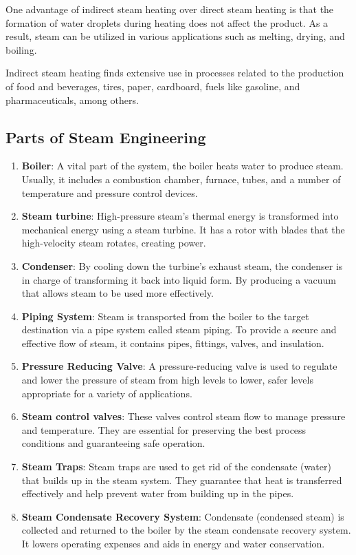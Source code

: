 One advantage of indirect steam heating over direct steam heating is that the formation of water droplets during heating does not affect the product. As a result, steam can be utilized in various applications such as melting, drying, and boiling.

Indirect steam heating finds extensive use in processes related to the production of food and beverages, tires, paper, cardboard, fuels like gasoline, and pharmaceuticals, among others.

\subsection{Parts of Steam Engineering}
\begin{enumerate}
    \item \textbf{Boiler}: A vital part of the system, the boiler heats water to produce steam. Usually, it includes a combustion chamber, furnace, tubes, and a number of temperature and pressure control devices. 
    \item \textbf{Steam turbine}: High-pressure steam's thermal energy is transformed into mechanical energy using a steam turbine. It has a rotor with blades that the high-velocity steam rotates, creating power. 
    \item \textbf{Condenser}: By cooling down the turbine's exhaust steam, the condenser is in charge of transforming it back into liquid form. By producing a vacuum that allows steam to be used more effectively. 
    \item \textbf{Piping System}: Steam is transported from the boiler to the target destination via a pipe system called steam piping. To provide a secure and effective flow of steam, it contains pipes, fittings, valves, and insulation. 
    \item \textbf{Pressure Reducing Valve}: A pressure-reducing valve is used to regulate and lower the pressure of steam from high levels to lower, safer levels appropriate for a variety of applications. 
    \item \textbf{Steam control valves}: These valves control steam flow to manage pressure and temperature. They are essential for preserving the best process conditions and guaranteeing safe operation. 
    \item \textbf{Steam Traps}: Steam traps are used to get rid of the condensate (water) that builds up in the steam system. They guarantee that heat is transferred effectively and help prevent water from building up in the pipes. 
    \item \textbf{Steam Condensate Recovery System}: Condensate (condensed steam) is collected and returned to the boiler by the steam condensate recovery system. It lowers operating expenses and aids in energy and water conservation. 

\end{enumerate}
